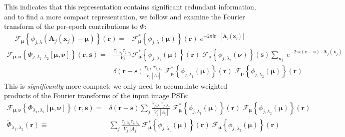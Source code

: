 \documentclass[DM,authoryear,toc]{lsstdoc}
\begin{document}
This indicates that this representation contains significant redundant information, and to find a more compact representation, we follow \citet{2015arXiv151206879Z} and examine the Fourier transform of the per-epoch contributions to $\Phi$:
\begin{align}
    \mathcal{F}_{\bm{\mu}}\!\left\{
        \phi_{j,\lambda}\!\left(\bm{A}_j(\bm{x}_j) - \bm{\mu}\right)
    \right\}\!\left(\bm{r}\right)
    =&
    \mathcal{F}^*_{\bm{\mu}}\!\left\{
        \phi_{j,\lambda}\!\left(\bm{\mu}\right)
    \right\}\!\left(\bm{r}\right)
    \; e^{-2\pi i \bm{r}\cdot \left[\bm{A}_j(\bm{x}_j)\right]}
\end{align}
\begin{align}
    \mathcal{F}_{\bm{\mu},\bm{\nu}}\!\left\{
        \Phi_{j,\lambda_1,\lambda_2}[\bm{\mu},\bm{\nu}]
    \right\}\!\left(\bm{r},\bm{s}\right)
     = & \frac{
            \tau_{j,\lambda_1}
            \tau_{j,\lambda_2}
        }{
            V_j
        }
        \mathcal{F}^*_{\bm{\mu}}\!\left\{
            \phi_{j,\lambda_1}\!\left(\bm{\mu}\right)
        \right\}\!\left(\bm{r}\right)
        \;
        \mathcal{F}_{\bm{\nu}}\!\left\{
            \phi_{j,\lambda_2}\!\left(\bm{\nu}\right)
        \right\}\!\left(\bm{s}\right)
        \sum_{\bm{x}_j}
        \;
        e^{-2\pi i (\bm{r} - \bm{s}) \cdot \bm{A}_j(\bm{x}_j)}
\\
    =&
        \delta\!\left(\bm{r}-\bm{s}\right)
        \frac{
            \tau_{j,\lambda_1}
            \tau_{j,\lambda_2}
        }{
            V_j \; |A_j|
        }
        \;
        \mathcal{F}^*_{\bm{\mu}}\!\left\{
            \phi_{j,\lambda_1}\!\left(\bm{\mu}\right)
        \right\}\!\left(\bm{r}\right)
        \;
        \mathcal{F}_{\bm{\mu}}\!\left\{
            \phi_{j,\lambda_2}\!\left(\bm{\mu}\right)
        \right\}\!\left(\bm{r}\right)
\end{align}
This is \emph{significantly} more compact: we only need to accumulate weighted products of the Fourier transforms of the input image PSFs:
\begin{align}
    \mathcal{F}_{\bm{\mu},\bm{\nu}}\!\left\{
        \Phi_{\lambda_1,\lambda_2}[\bm{\mu},\bm{\nu}]
    \right\}\!\left(\bm{r},\bm{s}\right)
    =&
    \delta\!\left(\bm{r}-\bm{s}\right)
    \sum_j
        \frac{
            \tau_{j,\lambda_1}
            \tau_{j,\lambda_2}
        }{
            V_j \; |A_j|
        }
        \;
        \mathcal{F}^*_{\bm{\mu}}\!\left\{
            \phi_{j,\lambda_1}\!\left(\bm{\mu}\right)
        \right\}\!\left(\bm{r}\right)
        \;
        \mathcal{F}_{\bm{\mu}}\!\left\{
            \phi_{j,\lambda_2}\!\left(\bm{\mu}\right)
        \right\}\!\left(\bm{r}\right)
    \\
    \widetilde{\Phi}_{\lambda_1,\lambda_2}(\bm{r})
    \equiv &
    \sum_j
        \frac{
            \tau_{j,\lambda_1}
            \tau_{j,\lambda_2}
        }{
            V_j \; |A_j|
        }
        \;
        \mathcal{F}^*_{\bm{\mu}}\!\left\{
            \phi_{j,\lambda_1}\!\left(\bm{\mu}\right)
        \right\}\!\left(\bm{r}\right)
        \;
        \mathcal{F}_{\bm{\mu}}\!\left\{
            \phi_{j,\lambda_2}\!\left(\bm{\mu}\right)
        \right\}\!\left(\bm{r}\right)
\label{eqn:phi-fourier-inputs}
\end{align}
\end{document}
